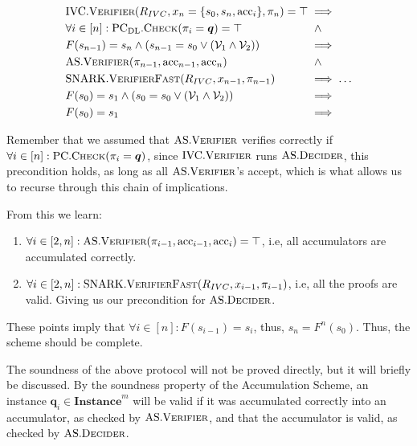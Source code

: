 \documentclass[
]{article}
\providecommand{\tightlist}{%
  \setlength{\itemsep}{0pt}\setlength{\parskip}{0pt}}
\newcommand*\Vc{\mathcal{V}}
\newcommand*{\then}{\implies}
\renewcommand{\vec}[1]{ \boldsymbol{#1} }
\newcommand*{\acc}{\mathrm{acc}}
\newcommand*{\Verifier}{\mathrm{\text{V\scriptsize ERIFIER}}}
\newcommand*{\Decider}{\mathrm{\text{D{\scriptsize ECIDER}}}}
\newcommand*{\SNARKVerifierFast}{\mathrm{\text{SNARK}}.\mathrm{\text{V\scriptsize ERIFIER}\text{F\scriptsize AST}}}
\newcommand*{\IVCVerifier}{\mathrm{\text{IVC}}.\Verifier}
\newcommand*{\AS}{\text{AS}}
\newcommand*{\ASVerifier}{\AS.\Verifier}
\newcommand*{\ASDecider}{\AS.\Decider}
\newcommand*{\PC}{\text{PC}}
\newcommand*{\PCCheck}{\PC.\mathrm{\text{C\scriptsize HECK}}}
\newcommand*{\PCDL}{\text{PC}_{\text{DL}}}
\newcommand*{\PCDLCheck}{\PCDL.\mathrm{\text{C\scriptsize HECK}}}
\newcommand*\Instance{\mathbf{Instance}}
\begin{document}
\[
\begin{alignedat}[b]{2}
  &\IVCVerifier(R_{IVC}, x_n = \{ s_0, s_n, \acc_i \}, \pi_n) = \top     &&\then \\
  &\forall i \in [n] : \PCDLCheck(\pi_i = \vec{q}) = \top                &&\;\; \land \\
  &F(s_{n-1}) = s_n     \land (s_{n-1} = s_0 \lor ( \Vc_1 \land \Vc_2 )) &&\then \\
  &\ASVerifier(\pi_{n-1}, \acc_{n-1}, \acc_n)                            &&\;\; \land \\
  &\SNARKVerifierFast(R_{IVC}, x_{n-1}, \pi_{n-1})                       &&\then \dots \\
  &F(s_0) = s_1 \land (s_0 = s_0 \lor ( \Vc_1 \land \Vc_2 ))             &&\then \\
  &F(s_0) = s_1                                                          &&\then \\
\end{alignedat}
\]

Remember that we assumed that \(\ASVerifier\) verifies correctly if
\(\forall i
\in [n] : \PCCheck(\pi_i = \vec{q})\), since \(\IVCVerifier\) runs
\(\ASDecider\), this precondition holds, as long as all
\(\ASVerifier\)'s accept, which is what allows us to recurse through
this chain of implications.

From this we learn:

\begin{enumerate}
\def\labelenumi{\arabic{enumi}.}
\tightlist
\item
  \(\forall i \in [2, n] : \ASVerifier(\pi_{i-1}, \acc_{i-1}, \acc_i) = \top\),
  i.e, all accumulators are accumulated correctly.
\item
  \(\forall i \in [2, n] : \SNARKVerifierFast(R_{IVC}, x_{i-1}, \pi_{i-1})\),
  i.e, all the proofs are valid. Giving us our precondition for
  \(\ASDecider\).
\end{enumerate}

These points imply that \(\forall i \in [n] : F(s_{i-1}) = s_i\), thus,
\(s_n = F^n(s_0)\). Thus, the scheme should be complete.

The soundness of the above protocol will not be proved directly, but it
will briefly be discussed. By the soundness property of the Accumulation
Scheme, an instance \(\vec{q}_i \in \Instance^m\) will be valid if it
was accumulated correctly into an accumulator, as checked by
\(\ASVerifier\), and that the accumulator is valid, as checked by
\(\ASDecider\).
\end{document}
